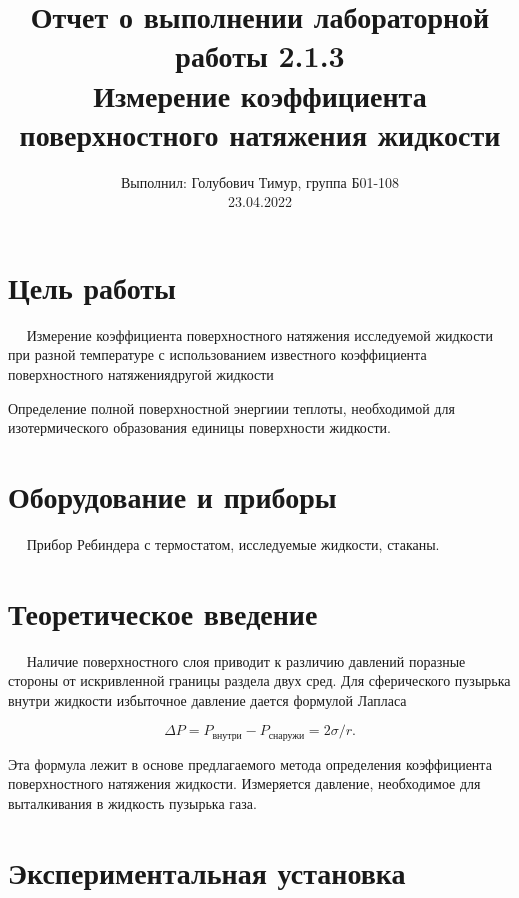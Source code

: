 \documentclass[12pt,a4paper]{article}
\author{\normalsize Выполнил: Голубович Тимур, группа Б01-108 \\
	\normalsize 23.04.2022}
\date{}
\title{
	\large Отчет о выполнении лабораторной работы 2.1.3 \\
	\Large Измерение коэффициента поверхностного натяжения жидкости \\ 
	
}
\begin{document}
	\maketitle
	
	\section*{Цель работы}
	
	$\quad$ Измерение коэффициента поверхностного натяжения исследуемой жидкости при разной температуре с использованием известного коэффициента поверхностного натяжениядругой жидкости
	
	Определение полной поверхностной энергиии теплоты, необходимой для изотермического образования единицы поверхности жидкости.
	
	\section*{Оборудование и приборы} 
	$\quad$ Прибор Ребиндера с термостатом, исследуемые жидкости, стаканы.
	
	\section*{Теоретическое введение}
	
	$\quad$ Наличие поверхностного слоя приводит к различию давлений поразные стороны от искривленной границы раздела двух сред. Для сферического пузырька внутри жидкости избыточное давление дается формулой Лапласа
	
	\begin{equation}
	\Delta P = P_\text{внутри}-P_\text{снаружи}=2\sigma/r.
	\end{equation}
	
	Эта формула лежит в основе предлагаемого метода определения коэффициента поверхностного натяжения жидкости. Измеряется давление, необходимое для выталкивания в жидкость пузырька газа.
	
	\section*{Экспериментальная установка}
	
\end{document}
